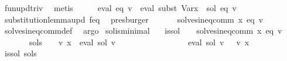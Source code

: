 \begin{isabellebody}
\ fun{\isacharunderscore}{\kern0pt}upd{\isacharunderscore}{\kern0pt}triv\ \isamarkupfalse%
\ metis\isanewline
\ \ \isamarkupfalse%
\ \isamarkupfalse%
\ {\isachardoublequoteopen}eval\ eq\ v\ {\isacharequal}{\kern0pt}\ eval\ {\isacharparenleft}{\kern0pt}subst\ {\isacharparenleft}{\kern0pt}Var{\isacharparenleft}{\kern0pt}x\ {\isacharcolon}{\kern0pt}{\isacharequal}{\kern0pt}\ sol{\isacharparenright}{\kern0pt}{\isacharparenright}{\kern0pt}\ eq{\isacharparenright}{\kern0pt}\ v{\isachardoublequoteclose}\isanewline
\ \ \ \ \isamarkupfalse%
\ substitution{\isacharunderscore}{\kern0pt}lemma{\isacharunderscore}{\kern0pt}upd{\isacharbrackleft}{\kern0pt}\ f{\isacharequal}{\kern0pt}eq{\isacharbrackright}{\kern0pt}\ \isamarkupfalse%
\ presburger\isanewline
\ \ \isamarkupfalse%
\ {\isacharasterisk}{\kern0pt}\ \isamarkupfalse%
\ {\isachardoublequoteopen}solves{\isacharunderscore}{\kern0pt}ineq{\isacharunderscore}{\kern0pt}comm\ x\ eq\ v{\isachardoublequoteclose}\ \isamarkupfalse%
\ solves{\isacharunderscore}{\kern0pt}ineq{\isacharunderscore}{\kern0pt}comm{\isacharunderscore}{\kern0pt}def\ \isamarkupfalse%
\ argo\isanewline
{}\isamarkupfalse%
%
\endisatagproof
{\isafoldproof}%
%
\isadelimproof
\isanewline
%
\endisadelimproof
\isanewline
{}\isamarkupfalse%
\ sol{\isacharunderscore}{\kern0pt}is{\isacharunderscore}{\kern0pt}minimal{\isacharcolon}{\kern0pt}\isanewline
\ \ \ is{\isacharunderscore}{\kern0pt}sol{\isacharcolon}{\kern0pt}\ \ \ \ {\isachardoublequoteopen}solves{\isacharunderscore}{\kern0pt}ineq{\isacharunderscore}{\kern0pt}comm\ x\ eq\ v{\isachardoublequoteclose}\isanewline
\ \ \ \ \ \ \ sol{\isacharprime}{\kern0pt}{\isacharunderscore}{\kern0pt}s{\isacharcolon}{\kern0pt}\ \ \ \ {\isachardoublequoteopen}v\ x\ {\isacharequal}{\kern0pt}\ eval\ sol{\isacharprime}{\kern0pt}\ v{\isachardoublequoteclose}\isanewline
\ \ \ \ \ \ \ \ \ \ \ \ \ \ \ \ {\isachardoublequoteopen}{\isasymPsi}\ {\isacharparenleft}{\kern0pt}eval\ sol\ v{\isacharparenright}{\kern0pt}\ {\isasymsubseteq}\ {\isasymPsi}\ {\isacharparenleft}{\kern0pt}v\ x{\isacharparenright}{\kern0pt}{\isachardoublequoteclose}\isanewline
%
\isadelimproof
%
\endisadelimproof
%
\isatagproof
{}\isamarkupfalse%
\ {\isacharminus}{\kern0pt}\isanewline
\ \ \isamarkupfalse%
\ is{\isacharunderscore}{\kern0pt}sol\ sol{\isacharprime}{\kern0pt}{\isacharunderscore}{\kern0pt}s\ \isamarkupfalse%

\end{isabellebody}

